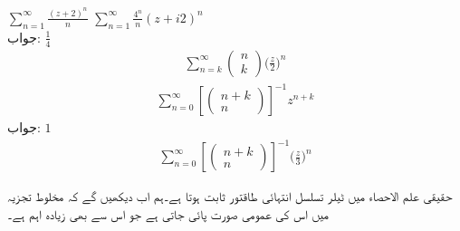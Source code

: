 \quad
$\sum\limits_{n=1}^{\infty} \tfrac{(z+2)^n}{n}$
\quad
$\sum\limits_{n=1}^{\infty} \tfrac{4^n}{n}(z+i2)^n$\\
جواب:\quad
$\tfrac{1}{4}$
\quad
\begin{align*}
\sum\limits_{n=k}^{\infty}
\begin{pmatrix}
n\\
k
\end{pmatrix}
\big(\frac{z}{2}\big)^n
\end{align*}
\quad
\begin{align*}
\sum\limits_{n=0}^{\infty}
\left[\begin{pmatrix} n+k\\n  \end{pmatrix}\right]^{-1} z^{n+k}
\end{align*}
جواب:\quad 
$1$
\quad
\begin{align*}
\sum\limits_{n=0}^{\infty}
\left[\begin{pmatrix} n+k\\n  \end{pmatrix}\right]^{-1} \big(\frac{z}{3}\big)^n
\end{align*}

حقیقی علم الاحصاء میں ٹیلر تسلسل انتہائی طاقتور ثابت ہوتا ہے۔ہم اب دیکھیں گے کہ مخلوط تجزیہ میں اس کی عمومی صورت پائی جاتی ہے جو اس سے بھی زیادہ اہم ہے۔

